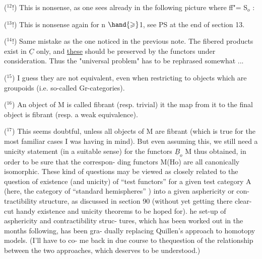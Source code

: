 
(${}^{12}$!)   This is nonsense, as one sees already in the following picture
where  f\hand{$\wedge$}f"= S$_{o}$ :  

(${}^{13}$!)   This is nonsense again for n $\hand{\geqslant}$1,  see PS at the end of section 13.

(${}^{14}$!)   Same mistake as  the one noticed in the previous note.  The
fibered products exist in $\underline{C}$\hand{$_{\bullet}$} only,  and \uline{these} should be preserved by the
functors under consideration. Thus the "universal problem"  has to be
rephrased somewhat ...

(${}^{15}$)   I guess they are not equivalent,  even when restricting to objects
which are groupoids (i.e. so-called Gr-categories).

(${}^{16}$)  An object of M is called fibrant (resp. trivial) it the map from it
to the final object is fibrant (resp. a weak equivalence).

(${}^{17}$)   This seems doubtful,  unless all objects of M are fibrant (which is
true for the most familiar cases I was having in mind).  But even assuming
this,  we still need a unicity statement (in a suitable sense) for the
functors  $\underline{B}_{o}$\hand{$\to$} M  thus obtained,  in order to be sure that the correspon-%
ding functors  M\hand{$\to$}(Ho) are all canonically isomorphic.  These kind of
questions may be viewed as closely related to the question of existence
(and unicity) of ``test functors'' for a given test category A (here,  the
category of ``standard hemispheres'' ) into a given asphericity or con-%
tractibility structure,  as discussed in section 90 (without yet getting
there  clear-cut handy existence and unicity theorems  to
be  hoped for).  he set-up of asphericity and contractibility struc-%
tures,  which has been worked out in the months following,  has been gra-%
dually replacing Quillen's approach to homotopy models.  (I'll have to co-%
me back in due course to the\hand{/}question of the relationship between the two
approaches,  which deserves to be understood.)

